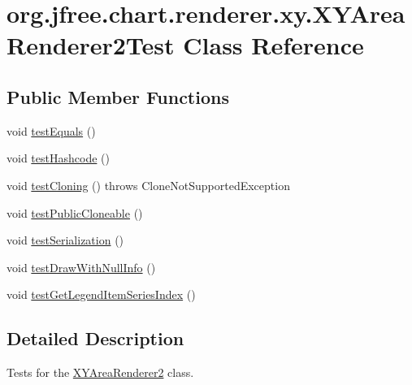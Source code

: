 \hypertarget{classorg_1_1jfree_1_1chart_1_1renderer_1_1xy_1_1_x_y_area_renderer2_test}{}\section{org.\+jfree.\+chart.\+renderer.\+xy.\+X\+Y\+Area\+Renderer2\+Test Class Reference}
\label{classorg_1_1jfree_1_1chart_1_1renderer_1_1xy_1_1_x_y_area_renderer2_test}
\subsection*{Public Member Functions}
\begin{DoxyCompactItemize}
\item 
void \mbox{\hyperlink{classorg_1_1jfree_1_1chart_1_1renderer_1_1xy_1_1_x_y_area_renderer2_test_a5fb0685ebb84e2a87aea7888b927ac26}{test\+Equals}} ()
\item 
void \mbox{\hyperlink{classorg_1_1jfree_1_1chart_1_1renderer_1_1xy_1_1_x_y_area_renderer2_test_a1bab58bac2c0655276f55b1f7b699616}{test\+Hashcode}} ()
\item 
void \mbox{\hyperlink{classorg_1_1jfree_1_1chart_1_1renderer_1_1xy_1_1_x_y_area_renderer2_test_affeb575edb34eb2d084e674cd346281f}{test\+Cloning}} ()  throws Clone\+Not\+Supported\+Exception 
\item 
void \mbox{\hyperlink{classorg_1_1jfree_1_1chart_1_1renderer_1_1xy_1_1_x_y_area_renderer2_test_ad28adcee4e63e9fc8d8c28dea1784a00}{test\+Public\+Cloneable}} ()
\item 
void \mbox{\hyperlink{classorg_1_1jfree_1_1chart_1_1renderer_1_1xy_1_1_x_y_area_renderer2_test_aa88bdcbb4ef4c77fe54eff210292778c}{test\+Serialization}} ()
\item 
void \mbox{\hyperlink{classorg_1_1jfree_1_1chart_1_1renderer_1_1xy_1_1_x_y_area_renderer2_test_a0be80a71c1fa78d29b5af36d56771543}{test\+Draw\+With\+Null\+Info}} ()
\item 
void \mbox{\hyperlink{classorg_1_1jfree_1_1chart_1_1renderer_1_1xy_1_1_x_y_area_renderer2_test_a2a779ace864f3f6a317957197aa30604}{test\+Get\+Legend\+Item\+Series\+Index}} ()
\end{DoxyCompactItemize}


\subsection{Detailed Description}
Tests for the \mbox{\hyperlink{classorg_1_1jfree_1_1chart_1_1renderer_1_1xy_1_1_x_y_area_renderer2}{X\+Y\+Area\+Renderer2}} class. 

